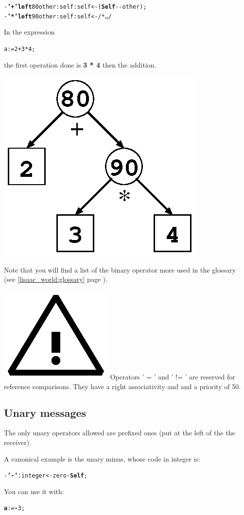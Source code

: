\documentclass[11pt]{mybook}
\newcommand{\warning}{\includegraphics[scale=0.3]{figures/warning}}
\begin{document}
\begin{alltt}
    - {\bf{}'+' left} 80 other:{\sc{}self} :{\sc{}self} <- ({\bf{}Self} - -other);
    - {\bf{}'*' left} 90 other:{\sc{}self} :{\sc{}self} <- /* \ldots */
\end{alltt}
In the expression
\begin{alltt}
    a := 2 + 3 * 4;
\end{alltt}
the first operation done is {\bf{}3 * 4} then the addition.
\begin{center}
\includegraphics[scale=0.7]{figures/binary}
\end{center}
Note that you will find a list of the binary operator more used in the glossary 
(see \ref{lisaac_world:glossary} page \pageref{lisaac_world:glossary}).

\warning{} Operators ' = ' and ' != ' are reserved for reference comparisons. They have a right associativity and and a priority of 50.
\subsection{Unary messages}
\label{language_reference:slot_descriptors:unary_messages}
%
The only unary operators allowed are prefixed ones (put at the left
of the the receiver).

A canonical example is the unary minus, whose code in {\sc{}integer}
is: 
\begin{alltt}
   - {\bf{}'-'}:{\sc{}integer} <- zero - {\bf{}Self};
\end{alltt}
You can use it with:
\begin{alltt}
   {\bf{}a} := {\bf{}-} 3;
\end{alltt}
\end{document}
